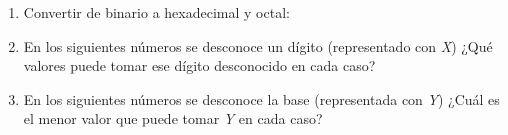 \documentclass[12pt]{article}
\begin{document}
\begin{enumerate}[resume]
    \item Convertir de binario a hexadecimal y octal:


    \item En los siguientes números se desconoce un dígito (representado con
        \emph{X}) ¿Qué valores puede tomar ese dígito desconocido en cada caso?


    \item En los siguientes números se desconoce la base (representada con
        \emph{Y}) ¿Cuál es el menor valor que puede tomar \emph{Y} en cada
        caso?


\end{enumerate}
\end{document}
